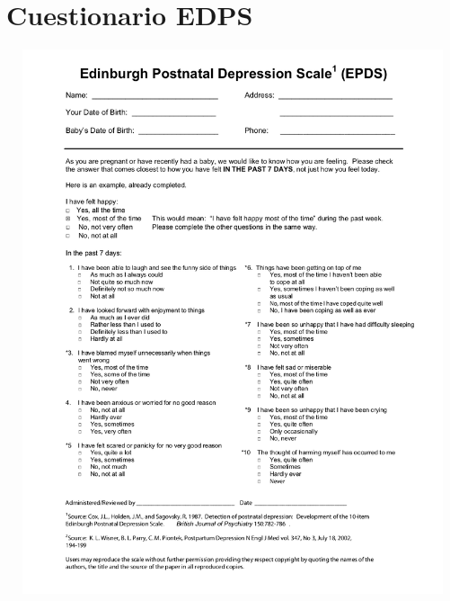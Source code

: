 \documentclass[twoside]{report}
\begin{document}


\newpage
\clearpage
\thispagestyle{empty}
\hfill
\clearpage
\printbibliography[heading=bibintoc, title = {Referencias}]


\appendix
\chapter{Cuestionario EDPS}\label{cap:apendiceA}
\vspace*{-1.4cm}
\begin{center}
	\hspace*{-1.6cm}
	\includegraphics[width=13.8cm,height=16cm]{Figure1.png}
\end{center}
\end{document}
